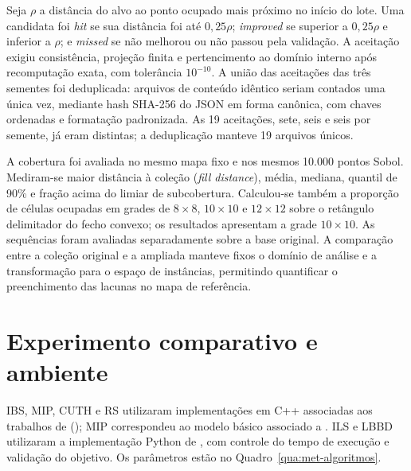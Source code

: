 Seja $\rho$ a distância do alvo ao ponto ocupado mais próximo no início do
lote. Uma candidata foi \textit{hit} se sua distância foi até $0{,}25\rho$;
\textit{improved} se superior a $0{,}25\rho$ e inferior a $\rho$; e
\textit{missed} se não melhorou ou não passou pela validação.
A aceitação exigiu consistência, projeção finita e pertencimento ao
domínio interno após recomputação exata, com tolerância $10^{-10}$.
A união das aceitações das três sementes foi deduplicada: arquivos de
conteúdo idêntico seriam contados uma única vez, mediante hash SHA-256 do
JSON em forma canônica, com chaves ordenadas e formatação padronizada.
As 19 aceitações, sete, seis e seis por semente, já eram distintas;
a deduplicação manteve 19 arquivos únicos.

A cobertura foi avaliada no mesmo mapa fixo e nos mesmos 10.000 pontos
Sobol. Mediram-se maior distância à coleção (\textit{fill distance}),
média, mediana, quantil de 90\% e fração acima do limiar de subcobertura.
Calculou-se também a proporção de células ocupadas em grades de
$8\times8$, $10\times10$ e $12\times12$ sobre o retângulo delimitador
do fecho convexo; os resultados apresentam a grade $10\times10$.
As sequências foram avaliadas separadamente sobre a base original.
A comparação entre a coleção original e a ampliada manteve fixos o domínio
de análise e a transformação para o espaço de instâncias, permitindo
quantificar o preenchimento das lacunas no mapa de referência.

\section{Experimento comparativo e ambiente}\label{sec:met-benchmark}

IBS, MIP, CUTH e RS utilizaram implementações em C++ associadas aos
trabalhos de  (\citeyear{DelazeriRitt2024,DelazeriRitt2026}); MIP correspondeu ao modelo básico associado
a . ILS e LBBD utilizaram a implementação
Python de , com controle
do tempo de execução e validação do objetivo. Os parâmetros estão no
Quadro~\ref{qua:met-algoritmos}.


